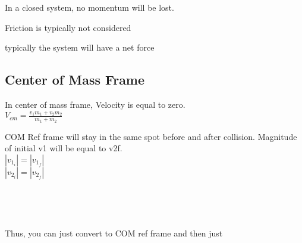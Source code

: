 \documentclass{article}
\begin{document}
    In a closed system, no momentum will be  lost. 

    \begin{list}{-}{}
        \item Friction is typically not considered 
        \item typically the system will have a net force
    \end{list}

    \subsection{Center of Mass Frame}
    In center of mass frame, Velocity is equal to zero. \\ [20pt]

    \begingroup 
    \centering
    \large
    $V_{cm} = \frac{v_1m_1+v_2m_2}{m_1 + m_2 }$\\[15pt]
    \endgroup

    COM Ref frame will stay in the same spot before and after collision. 
    Magnitude of initial v1 will be equal to v2f. \\

    \begingroup 
    \centering
    \large
    $|v_{1_i}| =|v_{1_f}|$ \\ [10pt]
    $|v_{2_i}| =|v_{2_f}|$ \\ [20pt]
    \endgroup


    \begingroup
    \centering
         \\ [15pt]

         \\ [15pt]
    \endgroup

    Thus, you can just convert to COM ref frame and then just  
\end{document}
